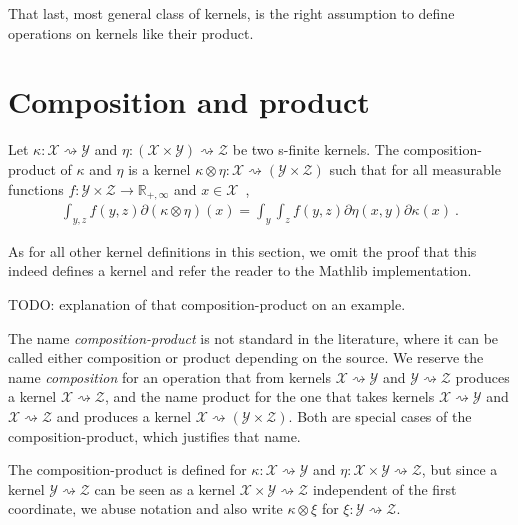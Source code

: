 That last, most general class of kernels, is the right assumption to define operations on kernels like their product.



\section{Composition and product}

\begin{definition}
  \label{def:kernel_compProd}
  \mathlibok
  Let $\kappa : \mathcal X \rightsquigarrow \mathcal Y$ and $\eta : (\mathcal X \times \mathcal Y) \rightsquigarrow \mathcal Z$ be two s-finite kernels.
  The composition-product of $\kappa$ and $\eta$ is a kernel $\kappa \otimes \eta : \mathcal X \rightsquigarrow (\mathcal Y \times \mathcal Z)$ such that for all measurable functions $f : \mathcal Y \times \mathcal Z \to \mathbb{R}_{+,\infty}$ and $x \in \mathcal X$~,
  \begin{align*}
  \int_{y,z} f(y,z) \partial(\kappa \otimes \eta)(x) = \int_y \int_z f(y,z) \partial\eta(x,y) \partial\kappa(x) \: .
  \end{align*}
\end{definition}

As for all other kernel definitions in this section, we omit the proof that this indeed defines a kernel and refer the reader to the Mathlib implementation.

TODO: explanation of that composition-product on an example.

The name \emph{composition-product} is not standard in the literature, where it can be called either composition or product depending on the source.
We reserve the name \emph{composition} for an operation that from kernels $\mathcal X \rightsquigarrow \mathcal Y$ and $\mathcal Y \rightsquigarrow \mathcal Z$ produces a kernel $\mathcal X \rightsquigarrow \mathcal Z$, and the name product for the one that takes kernels $\mathcal X \rightsquigarrow \mathcal Y$ and $\mathcal X \rightsquigarrow \mathcal Z$ and produces a kernel $\mathcal X \rightsquigarrow (\mathcal Y \times \mathcal Z)$.
Both are special cases of the composition-product, which justifies that name.

The composition-product is defined for $\kappa : \mathcal X \rightsquigarrow \mathcal Y$ and $\eta : \mathcal X \times \mathcal Y \rightsquigarrow \mathcal Z$, but since a kernel $\mathcal Y \rightsquigarrow \mathcal Z$ can be seen as a kernel $\mathcal X \times \mathcal Y \rightsquigarrow \mathcal Z$ independent of the first coordinate, we abuse notation and also write $\kappa \otimes \xi$ for $\xi : \mathcal Y \rightsquigarrow \mathcal Z$.

